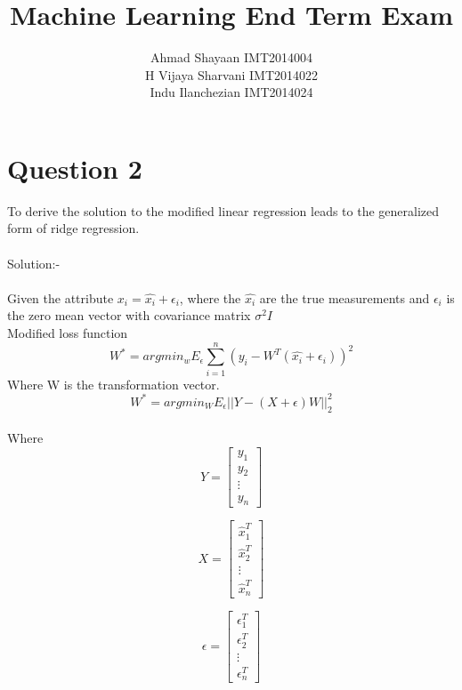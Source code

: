 \documentclass{article}
\title{Machine Learning End Term Exam}
\author{Ahmad Shayaan IMT2014004 \\ H Vijaya Sharvani IMT2014022 \\ Indu Ilanchezian IMT2014024}
\begin{document}
\maketitle
{}

\section*{Question 2}

To derive the solution to the modified linear regression leads to the generalized form of ridge regression.
\\
\\
Solution:-
\\
\\
Given the attribute $x_i = \hat{x_i} + \epsilon_i $, where the $\hat{x_i}$ are the true measurements and $\epsilon_i$ is the zero mean vector with covariance matrix $\sigma^2 I$
\\
Modified loss function
\begin{equation*}
W^* = argmin_w E_\epsilon\sum_{i=1}^{n}(y_i - W^T(\hat{x_i} + \epsilon_i))^2
\end{equation*}
Where W is the transformation vector.
\begin{equation}
W^* = argmin_W E_\epsilon || Y - (X+\epsilon)W||_2^2 \tag{1}
\end{equation}
\\
Where
\begin{equation*}
	Y = \begin{bmatrix}
	y_1\\y_2\\\vdots\\y_n 
	\end{bmatrix}
\end{equation*}

\begin{equation*}
	X = \begin{bmatrix}
	\hat{x}_1^T\\\hat{x}_2^T\\\vdots\\\hat{x}_n^T
	\end{bmatrix}
\end{equation*}

\begin{equation*}
	\epsilon = \begin{bmatrix}
		\epsilon_1^T\\\epsilon_2^T\\\vdots\\\epsilon_n^T
	\end{bmatrix}
\end{equation*}
\end{document}
